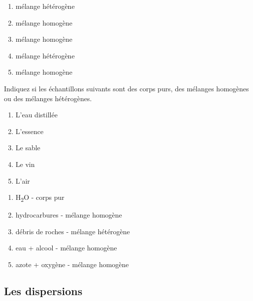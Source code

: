 \documentclass[
  11pt,
  a4paper,
  openany]{book}
\providecommand{\tightlist}{%
  \setlength{\itemsep}{0pt}\setlength{\parskip}{0pt}}
\begin{document}
\begin{Answer}

\begin{enumerate}
\def\labelenumi{\arabic{enumi}.}
\tightlist
\item
  mélange hétérogène
\item
  mélange homogène
\item
  mélange homogène
\item
  mélange hétérogène
\item
  mélange homogène
\end{enumerate}

\end{Answer}

\begin{Exercise}

Indiquez si les échantillons suivants sont des corps purs, des mélanges homogènes ou des mélanges hétérogènes.

\begin{enumerate}
\def\labelenumi{\arabic{enumi}.}
\tightlist
\item
  L'eau distillée
\item
  L'essence
\item
  Le sable
\item
  Le vin
\item
  L'air
\end{enumerate}

\end{Exercise}

\begin{Answer}

\begin{enumerate}
\def\labelenumi{\arabic{enumi}.}
\tightlist
\item
  H\textsubscript{2}O - corps pur
\item
  hydrocarbures - mélange homogène
\item
  débris de roches - mélange hétérogène
\item
  eau + alcool - mélange homogène
\item
  azote + oxygène - mélange homogène
\end{enumerate}

\end{Answer}

\subsection{Les dispersions}\label{les-dispersions}
\end{document}
